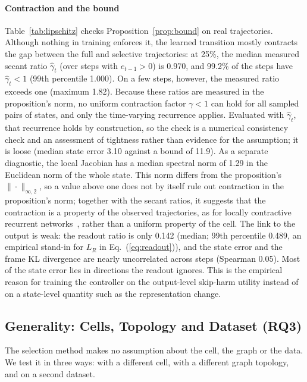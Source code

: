 \paragraph*{Contraction and the bound}
\label{sec:lip}
Table~\ref{tab:lipschitz} checks Proposition~\ref{prop:bound} on real trajectories. Although nothing in training enforces it, the learned transition mostly contracts the gap between the full and selective trajectories: at 25\%, the median measured secant ratio $\hat\gamma_t$ (over steps with $e_{t-1}>0$) is 0.970, and 99.2\% of the steps have $\hat\gamma_t<1$ (99th percentile 1.000). On a few steps, however, the measured ratio exceeds one (maximum 1.82). Because these ratios are measured in the proposition's norm, no uniform contraction factor $\gamma<1$ can hold for all sampled pairs of states, and only the time-varying recurrence applies. Evaluated with $\hat\gamma_t$, that recurrence holds by construction, so the check is a numerical consistency check and an assessment of tightness rather than evidence for the assumption; it is loose (median state error 3.10 against a bound of 11.9). As a separate diagnostic, the local Jacobian has a median spectral norm of 1.29 in the Euclidean norm of the whole state. This norm differs from the proposition's $\|\cdot\|_{\infty,2}$, so a value above one does not by itself rule out contraction in the proposition's norm; together with the secant ratios, it suggests that the contraction is a property of the observed trajectories, as for locally contractive recurrent networks~\cite{mitarchuk2024length}, rather than a uniform property of the cell. The link to the output is weak: the readout ratio is only 0.142 (median; 99th percentile 0.489, an empirical stand-in for $L_R$ in Eq.~(\ref{eq:readout})), and the state error and the frame KL divergence are nearly uncorrelated across steps (Spearman 0.05). Most of the state error lies in directions the readout ignores. This is the empirical reason for training the controller on the output-level skip-harm utility instead of on a state-level quantity such as the representation change.

\liptable

\subsection{Generality: Cells, Topology and Dataset (RQ3)}
\label{sec:generality}
The selection method makes no assumption about the cell, the graph or the data. We test it in three ways: with a different cell, with a different graph topology, and on a second dataset.

